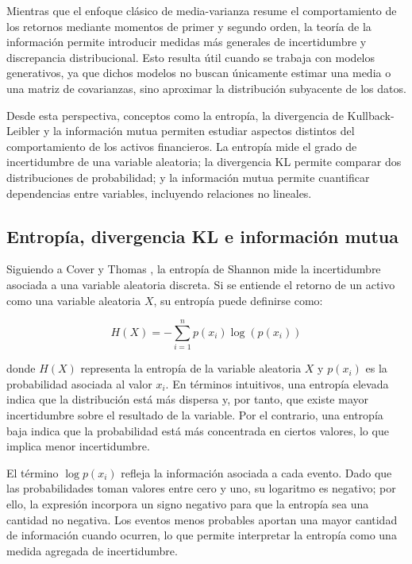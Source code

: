 Mientras que el enfoque clásico de media-varianza resume el comportamiento de los retornos mediante momentos de primer y segundo orden, la teoría de la información permite introducir medidas más generales de incertidumbre y discrepancia distribucional. Esto resulta útil cuando se trabaja con modelos generativos, ya que dichos modelos no buscan únicamente estimar una media o una matriz de covarianzas, sino aproximar la distribución subyacente de los datos.

Desde esta perspectiva, conceptos como la entropía, la divergencia de Kullback-Leibler y la información mutua permiten estudiar aspectos distintos del comportamiento de los activos financieros. La entropía mide el grado de incertidumbre de una variable aleatoria; la divergencia KL permite comparar dos distribuciones de probabilidad; y la información mutua permite cuantificar dependencias entre variables, incluyendo relaciones no lineales.

\subsection{Entropía, divergencia KL e información mutua}

Siguiendo a Cover y Thomas \cite{cover2006elements}, la entropía de Shannon mide la incertidumbre asociada a una variable aleatoria discreta. Si se entiende el retorno de un activo como una variable aleatoria $X$, su entropía puede definirse como:

\begin{equation}
H(X) = - \sum_{i=1}^{n} p(x_i)\log\left(p(x_i)\right)
\end{equation}

donde $H(X)$ representa la entropía de la variable aleatoria $X$ y $p(x_i)$ es la probabilidad asociada al valor $x_i$. En términos intuitivos, una entropía elevada indica que la distribución está más dispersa y, por tanto, que existe mayor incertidumbre sobre el resultado de la variable. Por el contrario, una entropía baja indica que la probabilidad está más concentrada en ciertos valores, lo que implica menor incertidumbre.

El término $\log p(x_i)$ refleja la información asociada a cada evento. Dado que las probabilidades toman valores entre cero y uno, su logaritmo es negativo; por ello, la expresión incorpora un signo negativo para que la entropía sea una cantidad no negativa. Los eventos menos probables aportan una mayor cantidad de información cuando ocurren, lo que permite interpretar la entropía como una medida agregada de incertidumbre.


